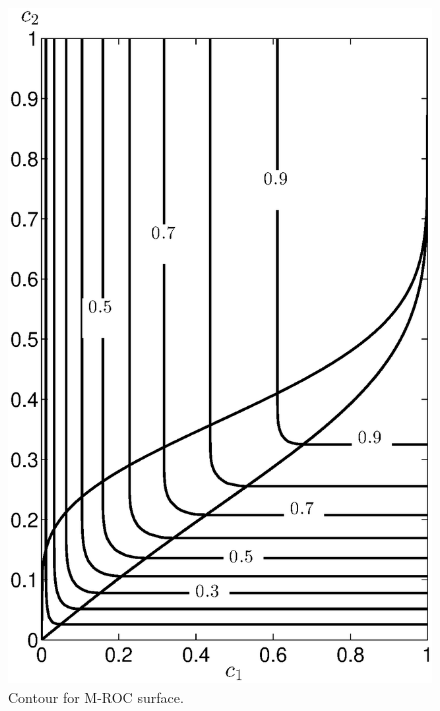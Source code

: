 \documentclass[12pt,journal,a4paper,twoside,onecolumn]{IEEEtran}
\begin{document}
\begin{spacing}{2.5}
\begin{figure}[!t]
\centering
\includegraphics[width=12cm]{LJcontour.eps}
\caption{Contour for M-ROC surface.}
\label{pic: LJS contour}
\end{figure}



\end{spacing}
\end{document}
